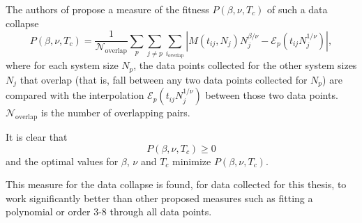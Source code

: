 The authors of \cite{bhattacharjee2001measure} propose a measure of the fitness $P(\beta, \nu, T_c)$ of such a data collapse
\begin{equation}
  P(\beta, \nu, T_c) = \frac{1}{\mathcal{N}_{\text{overlap}}} \sum_p \sum_{j \neq p} \sum_{i_{\text{overlap}}}
    |  M(t_{i j}, N_j) N_{j}^{\beta/\nu} - \mathcal{E}_{p}(t_{i j} N_{j}^{1/\nu} ) |,
\end{equation}
where for each system size $N_p$, the data points collected for the other system sizes $N_j$ that overlap (that is,
fall between any two data points collected for $N_p$) are compared with the interpolation $\mathcal{E}_{p}(t_{i j}
N_{j}^{1/\nu})$ between those two data points. $\mathcal{N}_{\text{overlap}}$ is the number of overlapping pairs.

It is clear that
\begin{equation}
  P(\beta, \nu, T_c) \geq 0
\end{equation}
and the optimal values for $\beta$, $\nu$ and $T_c$ minimize $P(\beta, \nu, T_c)$.

This measure for the data collapse is found, for data collected for this thesis,
to work significantly better than other proposed measures such as fitting a polynomial or order 3-8 through all data
points.
